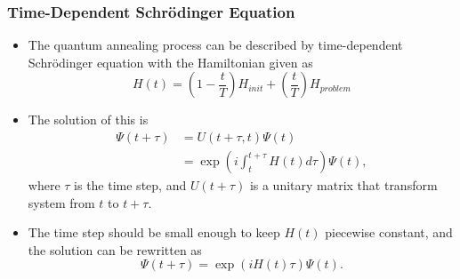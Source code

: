 \documentclass{beamer}
\begin{document}
\begin{frame}
	\frametitle{Time-Dependent Schrödinger Equation}
	
	\begin{itemize}
		\item The quantum annealing process can be described by time-dependent Schrödinger equation with the Hamiltonian given as
		\begin{equation*}
		H(t)=(1-\frac{t}{T} )H_{init}+(\frac{t}{T})H_{problem}
		\end{equation*}
		\item The solution of this is 
		\begin{equation*}
		\begin{split}
		\Psi(t+\tau)&=U(t+\tau,t)\Psi(t)\\
		&=\exp(i\int_{t}^{t+\tau}H(t)d\tau)\Psi(t),
		\end{split}
		\end{equation*}
		where $\tau$ is the time step, and $U(t+\tau)$ is a unitary matrix that transform system from $t$ to $t+\tau$.
		\item 	The time step should be small enough to keep $H(t)$ piecewise constant, and the solution can be rewritten as 
		\begin{equation*}
		\Psi(t+\tau) =\exp(iH(t)\tau)\Psi(t).
		\end{equation*}
		
	\end{itemize}
	


\end{frame}

\end{document}
